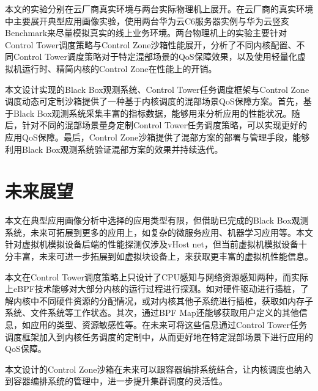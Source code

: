 本文的实验分别在云厂商真实环境与两台实际物理机上展开。在云厂商的真实环境中主要展开典型应用画像实验，使用两台华为云C6服务器实例与华为云竖亥Benchmark来尽量模拟真实的线上业务环境。两台物理机上的实验主要针对Control Tower调度策略与Control Zone沙箱性能展开，分析了不同内核配置、不同Control Tower调度策略对于特定混部场景的QoS保障效果，以及使用轻量化虚拟机运行时、精简内核的Control Zone在性能上的开销。

本文设计实现的Black Box观测系统、Control Tower任务调度框架与Control Zone调度动态可定制沙箱提供了一种基于内核调度的混部场景QoS保障方案。首先，基于Black Box观测系统采集丰富的指标数据，能够用来分析应用的性能状况。随后，针对不同的混部场景量身定制Control Tower任务调度策略，可以实现更好的应用QoS保障。最后，Control Zone沙箱提供了混部方案的部署与管理手段，能够利用Black Box观测系统验证混部方案的效果并持续迭代。

\section{未来展望}

本文在典型应用画像分析中选择的应用类型有限，但借助已完成的Black Box观测系统，未来可拓展到更多的应用上，如复杂的微服务应用、机器学习应用等。本文针对虚拟机模拟设备后端的性能探测仅涉及vHost net，但当前虚拟机模拟设备十分丰富，未来可进一步拓展到如虚拟块设备上，来获取更丰富的虚拟机性能信息。

本文在Control Tower调度策略上只设计了CPU感知与网络资源感知两种，而实际上eBPF技术能够对大部分内核的运行过程进行探测。如对硬件驱动进行插桩，了解内核中不同硬件资源的分配情况，或对内核其他子系统进行插桩，获取如内存子系统、文件系统等工作状态。其次，通过BPF Map还能够获取用户定义的其他信息，如应用的类型、资源敏感性等。在未来可将这些信息通过Control Tower任务调度框架加入到内核任务调度的定制中，从而更好地在特定混部场景下进行应用的QoS保障。

本文设计的Control Zone沙箱在未来可以跟容器编排系统结合，让内核调度也纳入到容器编排系统的管理中，进一步提升集群调度的灵活性。